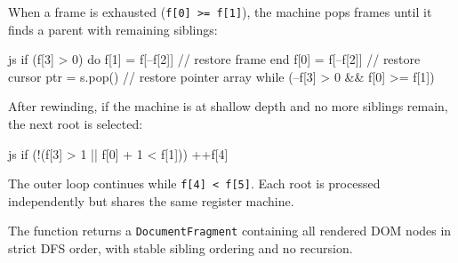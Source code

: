 \begin{NxLightBox}[title={Phase 4 -- Rewind}]
	\begin{NxLightP}
		When a frame is exhausted (\texttt{f[0] >= f[1]}), the machine pops frames until it finds a parent with remaining siblings:
	\end{NxLightP}

	\begin{NxCodeBox}{js}{}
if (f[3] > 0) do {
	f[1] = f[--f[2]]   // restore frame end
	f[0] = f[--f[2]]   // restore cursor
	ptr  = s.pop()	 // restore pointer array
} while (--f[3] > 0 && f[0] >= f[1])
	\end{NxCodeBox}

	\begin{NxLightList}
	\end{NxLightList}
\end{NxLightBox}

\begin{NxLightBox}[title={Root Advancement}]
	\begin{NxLightP}
		After rewinding, if the machine is at shallow depth and no more siblings remain, the next root is selected:
	\end{NxLightP}

	\begin{NxCodeBox}{js}{}
if (!(f[3] > 1 || f[0] + 1 < f[1]))
	++f[4]
	\end{NxCodeBox}

	\begin{NxLightP}
		The outer loop continues while \texttt{f[4] < f[5]}. Each root is processed independently but shares the same register machine.
	\end{NxLightP}
\end{NxLightBox}

\begin{NxLightBox}[title={Output}]
	\begin{NxLightP}
		The function returns a \texttt{DocumentFragment} containing all rendered DOM nodes in strict DFS order, with stable sibling ordering and no recursion.
	\end{NxLightP}
\end{NxLightBox}


